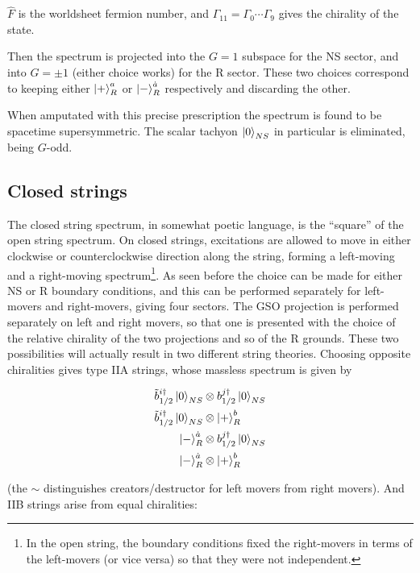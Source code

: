 $\hat F$ is the worldsheet fermion number, and $\Gamma_{11} = \Gamma_0 \cdots\Gamma_9$ gives the chirality of the state.

Then the spectrum is projected into the $G=1$ subspace for the NS sector, and into $G=\pm1$ (either choice works) for the R sector. These two choices correspond to keeping either $\ket{+}^a_R$ or $\ket{-}^{\dot a}_R$ respectively and discarding the other.

When amputated with this precise prescription the spectrum is found to be spacetime supersymmetric. The scalar tachyon $\ket{0}_{NS}$ in particular is eliminated, being $G$-odd.

\subsection{Closed strings}

The closed string spectrum, in somewhat poetic language, is the ``square'' of the open string spectrum. On closed strings, excitations are allowed to move in either clockwise or counterclockwise direction along the string, forming a left-moving and a right-moving spectrum\footnote{In the open string, the boundary conditions fixed the right-movers in terms of the left-movers (or vice versa) so that they were not independent.}. As seen before the choice can be made for either NS or R boundary conditions, and this can be performed separately for left-movers and right-movers, giving four sectors. The GSO projection is performed separately on left and right movers, so that one is presented with the choice of the relative chirality of the two projections and so of the R grounds. These two possibilities will actually result in two different string theories. Choosing opposite chiralities gives type IIA strings, whose massless spectrum is given by

\begin{align}
	\tilde b_{1/2}^{i\dagger} \ket 0_{NS} &\otimes b_{1/2}^{j\dagger}\ket{0}_{NS} \label{NSNSground2}\\
	\tilde b_{1/2}^{i\dagger} \ket 0_{NS} &\otimes \ket{+}^b_{R}\\
	\ket{-}^{\dot a}_R &\otimes b_{1/2}^{j\dagger}\ket{0}_{NS}\\
	\ket{-}^{\dot a}_R &\otimes \ket{+}^b_R
	\label{}
\end{align}

(the $\sim$ distinguishes creators/destructor for left movers from right movers). And IIB strings arise from equal chiralities:


